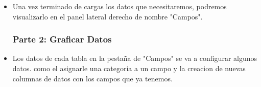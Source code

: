 \begin{itemize}
\clearpage
		\begin{figure}[h]
		\begin{center}
		\end{center}
		\end{figure}

		\item Una vez terminado de cargas los datos que necesitaremos, podremos visualizarlo en el panel lateral derecho de nombre "Campos".	
     \subsubsection{Parte 2: Graficar Datos }
	\item Los datos de cada tabla en la pestaña de "Campos" se va a configurar algunos datos. como el asignarle una categoria a un campo y la creacion de nuevas columnas de datos con los campos que ya tenemos.
\begin{figure}[h]
		\begin{center}
		\end{center}
		\end{figure}
\clearpage

\end{itemize}
